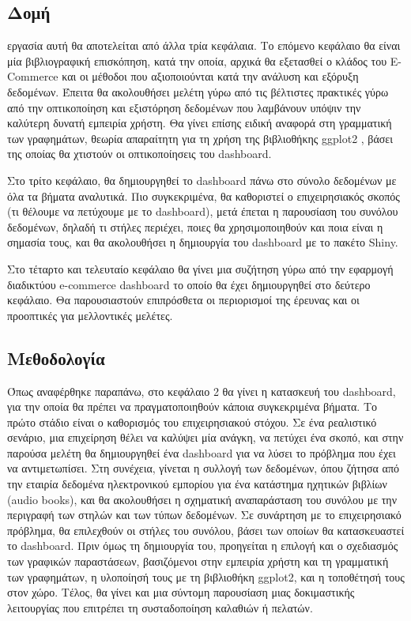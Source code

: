 \documentclass{article}
\begin{document}

\subsection{Δομή}

 εργασία αυτή θα αποτελείται από άλλα τρία κεφάλαια. Το επόμενο κεφάλαιο θα είναι μία βιβλιογραφική επισκόπηση, κατά την οποία, αρχικά θα εξετασθεί ο κλάδος του E-Commerce και οι μέθοδοι που αξιοποιούνται κατά την ανάλυση και εξόρυξη δεδομένων. Έπειτα θα ακολουθήσει μελέτη γύρω από τις βέλτιστες πρακτικές γύρω από την οπτικοποίηση και εξιστόρηση δεδομένων που λαμβάνουν υπόψιν την καλύτερη δυνατή εμπειρία χρήστη. Θα γίνει επίσης ειδική αναφορά στη γραμματική των γραφημάτων, θεωρία απαραίτητη για τη χρήση της βιβλιοθήκης ggplot2 \cite{wickham2016data}, βάσει της οποίας θα χτιστούν οι οπτικοποίησεις του dashboard.

Στο τρίτο κεφάλαιο, θα δημιουργηθεί το dashboard πάνω στο σύνολο δεδομένων με όλα τα βήματα αναλυτικά. Πιο συγκεκριμένα, θα καθοριστεί ο επιχειρησιακός σκοπός (τι θέλουμε να πετύχουμε με το dashboard), μετά έπεται η παρουσίαση του συνόλου δεδομένων, δηλαδή τι στήλες περιέχει, ποιες θα χρησιμοποιηθούν και ποια είναι η σημασία τους, και θα ακολουθήσει η δημιουργία του dashboard με το πακέτο Shiny.

Στο τέταρτο και τελευταίο κεφάλαιο θα γίνει μια συζήτηση γύρω από την εφαρμογή διαδικτύου e-commerce dashboard το οποίο θα έχει δημιουργηθεί στο δεύτερο κεφάλαιο. Θα παρουσιαστούν επιπρόσθετα οι περιορισμοί της έρευνας και οι προοπτικές για μελλοντικές μελέτες.


\subsection{Μεθοδολογία}

Όπως αναφέρθηκε παραπάνω, στο κεφάλαιο 2 θα γίνει η κατασκευή του dashboard, για την οποία θα πρέπει να πραγματοποιηθούν κάποια συγκεκριμένα βήματα. Το πρώτο στάδιο είναι ο καθορισμός του επιχειρησιακού στόχου. Σε ένα ρεαλιστικό σενάριο, μια επιχείρηση θέλει να καλύψει μία ανάγκη, να πετύχει ένα σκοπό, και στην παρούσα μελέτη θα δημιουργηθεί ένα dashboard για να λύσει το πρόβλημα που έχει να αντιμετωπίσει. Στη συνέχεια, γίνεται η συλλογή των δεδομένων, όπου ζήτησα από την εταιρία δεδομένα ηλεκτρονικού εμπορίου για ένα κατάστημα ηχητικών βιβλίων (audio books), και θα ακολουθήσει η σχηματική αναπαράσταση του συνόλου με την περιγραφή των στηλών και των τύπων δεδομένων. Σε συνάρτηση με το επιχειρησιακό πρόβλημα, θα επιλεχθούν οι στήλες του συνόλου, βάσει των οποίων θα κατασκευαστεί το dashboard. Πριν όμως τη δημιουργία του, προηγείται η επιλογή και ο σχεδιασμός των γραφικών παραστάσεων, βασιζόμενοι στην εμπειρία χρήστη και τη γραμματική των γραφημάτων, η υλοποίησή τους με τη βιβλιοθήκη ggplot2, και η τοποθέτησή τους στον χώρο. Τέλος, θα γίνει και μια σύντομη παρουσίαση μιας δοκιμαστικής λειτουργίας που επιτρέπει τη συσταδοποίηση καλαθιών ή πελατών.
\end{document}
